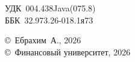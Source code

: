\vfill

\noindent
{\small
УДК~004.438Java(075.8)\\
ББК~32.973.26-018.1я73
\par}

\vspace{6mm}

\noindent
{\small
\copyright~Ебрахим~А., 2026\\
\copyright~Финансовый университет, 2026
\par}

\clearpage
